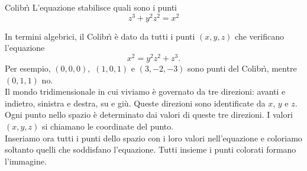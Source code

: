 \begin{surferPage}{Colibr\`{\i}}
L'equazione stabilisce quali sono i punti\\
  
  \smallskip
\[z^3+ y^2	z^2	= x^2\]

\singlespacing
In termini algebrici, il Colibr\`{\i} \`e dato da tutti i punti $(x, y, z)$ che verificano l'equazione
\smallskip
\[ x^2= y^2z^2+z^3.\]
\smallskip
Per esempio, $(0,0,0),$ $(1,0,1)$ e $(3,-2,-3)$ sono punti del Colibr\`{\i}, mentre $(0,1,1)$ no.\\
 \singlespacing
Il mondo tridimensionale in cui viviamo \`e governato da tre direzioni: avanti e indietro, sinistra e destra, su e gi\`u. Queste direzioni sono identificate da  $x$, $y$ e $z$. Ogni punto nello spazio \`e determinato dai valori di queste tre direzioni. I valori $(x,y,z)$ si chiamano le coordinate del punto.\\
\singlespacing
Inseriamo ora tutti i punti dello spazio con i loro valori nell'equazione e coloriamo soltanto quelli che soddisfano l'equazione. Tutti insieme i punti colorati formano l'immagine.
\end{surferPage}

